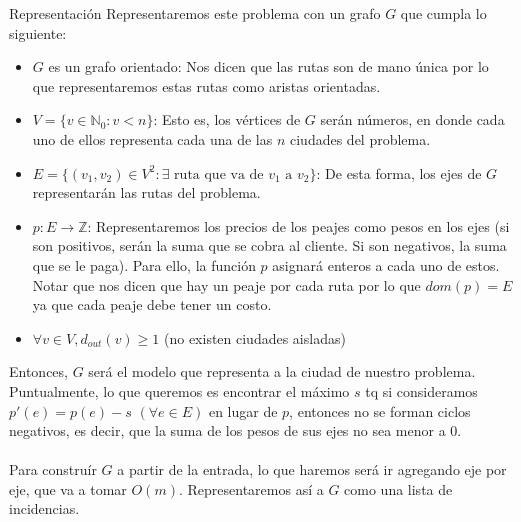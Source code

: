 
\begin{subsection}{Representaci\'{o}n}
Representaremos este problema con un grafo $G$ que cumpla lo siguiente:
\begin{itemize}
	\item{$G$ es un grafo orientado: Nos dicen que las rutas son de mano \'{u}nica por lo que representaremos estas rutas como aristas orientadas.}
    \item{$V = \{v \in \mathbb{N}_0 : v < n \}$: Esto es, los v\'{e}rtices de $G$ ser\'{a}n n\'{u}meros, en donde cada uno de ellos representa cada una de las $n$ ciudades del problema.}
    \item{$E = \{(v_1, v_2) \in V^2 : \text{$\exists$ ruta que va de $v_1$ a $v_2$}  \}$: De esta forma, los ejes de $G$ representar\'{a}n las rutas del problema.}
    \item{$p:E \rightarrow \mathbb{Z}$: Representaremos los precios de los peajes como pesos en los ejes (si son positivos, ser\'{a}n la suma que se cobra al cliente. Si son negativos, la suma que se le paga). Para ello, la funci\'{o}n $p$ asignar\'{a} enteros a cada uno de estos. Notar que nos dicen que hay un peaje por cada ruta por lo que $dom(p)=E$ ya que cada peaje debe tener un costo.  }
    \item{$\forall v \in V, {d_{out}}(v) \geq 1$ (no existen ciudades aisladas)}

\end{itemize}
Entonces, $G$ ser\'{a} el modelo que representa a la ciudad de nuestro problema. Puntualmente, lo que queremos es encontrar el m\'{a}ximo $s$ tq si consideramos $p'(e) = p(e) - s$ $(\forall e \in E)$ en lugar de $p$, entonces no se forman ciclos negativos, es decir, que la suma de los pesos de sus ejes no sea menor a 0. \\ \\ 
Para constru\'{i}r $G$ a partir de la entrada, lo que haremos ser\'{a} ir agregando eje por eje, que va a tomar $O(m)$. Representaremos as\'{i} a $G$ como una lista de incidencias.
\end{subsection}


